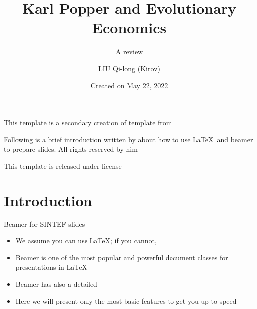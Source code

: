 \documentclass{sintefbeamer}
\title{Karl Popper and Evolutionary Economics}
\subtitle{A review}
\author{\href{mailto:qilong-kirov.liu@connect.polyu.hk}{LIU Qi-long (Kirov)}}
\date{Created on May 22, 2022}
\begin{document}
\maketitle

\begin{frame}

This template is a secondary creation of  template from  \vspace{\baselineskip}

Following is a brief introduction written by  about how to use \LaTeX\ and beamer to prepare slides. All rights reserved by him\vspace{\baselineskip}

This template is released under  license

\end{frame}

\section{Introduction}

\begin{frame}{Beamer for SINTEF slides}{\thesection \, \secname}

\begin{itemize}
\item We assume you can use \LaTeX; if you cannot,
\item Beamer is one of the most popular and powerful document
classes for presentations in \LaTeX
\item Beamer has also a detailed
\item Here we will present only the most basic features to get you up to speed
\end{itemize}
\end{frame}
\end{document}
